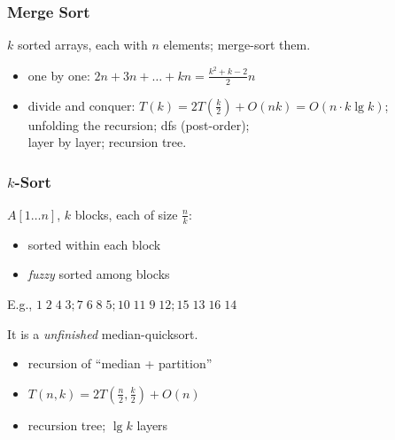\documentclass{beamer}
\begin{document}
\begin{frame}
  \frametitle{Merge Sort}
  
  \begin{Problem}
    $k$ sorted arrays, each with $n$ elements; merge-sort them.
  \end{Problem}
  
  \begin{itemize}
    \item one by one: $2n + 3n + \ldots + kn = \frac{k^2 + k - 2}{2}n$
    \item divide and conquer: $T(k) = 2T(\frac{k}{2}) + O(nk) = O(n \cdot k
    \lg k)$; \\
    unfolding the recursion; dfs (post-order); \\
    layer by layer; recursion tree. 
  \end{itemize}
\end{frame}

\begin{frame}
  \frametitle{$k$-Sort}
  
  \begin{Problem}
    $A[1 \ldots n]$, $k$ blocks, each of size $\frac{n}{k}$:
    \begin{itemize}
      \item sorted within each block
      \item \emph{fuzzy} sorted among blocks
    \end{itemize}
    E.g., $1\; 2\; 4\; 3; 7\; 6\; 8\; 5; 10\; 11\; 9\; 12; 15\; 13\; 16\; 14$
  \end{Problem}
  
  \vspace{0.40cm}
  It is a \emph{unfinished} median-quicksort.
  \begin{itemize}
    \item recursion of ``median + partition''
    \item $T(n,k) = 2T(\frac{n}{2}, \frac{k}{2}) + O(n)$
    \item recursion tree; $\lg k$ layers
  \end{itemize}
\end{frame}
\end{document}

